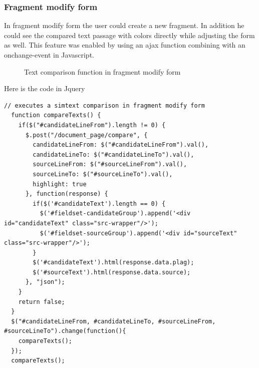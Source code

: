 \subsubsection{Fragment modify form}

In fragment modify form the user could create a new fragment. In addition he could see the compared text passage with colors directly while adjusting the form as well. This feature was enabled by using an ajax function combining with an onchange-event in Javascript.

\begin{figure}[!h]
  \centering
  \caption{Text comparison function in fragment modify form}
  \label{fig:report_deckblatt}
\end{figure}

Here is the code in Jquery

\begin{lstlisting}
// executes a simtext comparison in fragment modify form
  function compareTexts() {
    if($("#candidateLineFrom").length != 0) {
      $.post("/document_page/compare", {
        candidateLineFrom: $("#candidateLineFrom").val(),
        candidateLineTo: $("#candidateLineTo").val(),
        sourceLineFrom: $("#sourceLineFrom").val(),
        sourceLineTo: $("#sourceLineTo").val(),
        highlight: true
      }, function(response) {
        if($('#candidateText').length == 0) {
          $('#fieldset-candidateGroup').append('<div id="candidateText" class="src-wrapper"/>');
          $('#fieldset-sourceGroup').append('<div id="sourceText" class="src-wrapper"/>');
        }
        $('#candidateText').html(response.data.plag);
        $('#sourceText').html(response.data.source);
      }, "json");
    }
    return false;
  }
  $("#candidateLineFrom, #candidateLineTo, #sourceLineFrom, #sourceLineTo").change(function(){
    compareTexts();
  });
  compareTexts();
\end{lstlisting}